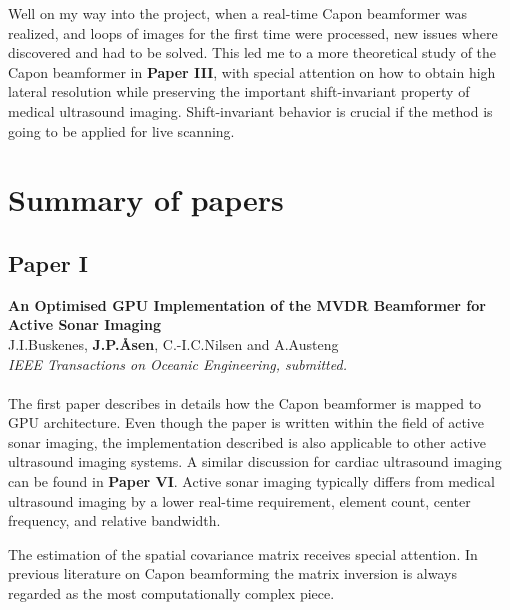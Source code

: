 Well on my way into the project, when a real-time Capon beamformer was realized, and loops of images for the first time were processed, new issues where discovered and had to be solved. This led me to a more theoretical study of the Capon beamformer in \textbf{Paper III}, with special attention on how to obtain high lateral resolution while preserving the important shift-invariant property of medical ultrasound imaging. Shift-invariant behavior is crucial if the method is going to be applied for live scanning. 



\section{Summary of papers}

\subsection{Paper I}
\textbf{An Optimised GPU Implementation of the MVDR Beamformer for Active Sonar Imaging}\\
J.\:I.\:Buskenes, \textbf{J.\:P.\:\AA{}sen}, C.-I.\:C.\:Nilsen and A.\:Austeng\\
{\it IEEE Transactions on Oceanic Engineering, submitted.}\\\\
The first paper describes in details how the Capon beamformer is mapped to GPU architecture. Even though the paper is written within the field of active sonar imaging, the implementation described is also applicable to other active ultrasound imaging systems. A similar discussion for cardiac ultrasound imaging can be found in \textbf{Paper VI}.  Active sonar imaging typically differs from medical ultrasound imaging by a lower real-time requirement, element count, center frequency, and relative bandwidth. 

The estimation of the spatial covariance matrix receives special attention. In previous literature on Capon beamforming the matrix inversion is always regarded as the most computationally complex piece. 


